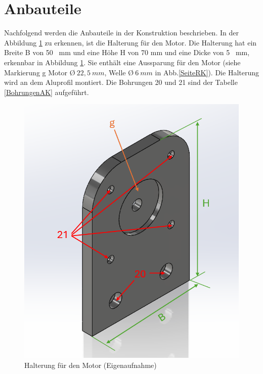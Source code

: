 \section{Anbauteile}

Nachfolgend werden die Anbauteile in der Konstruktion beschrieben. 
In der Abbildung \ref{FlankeMotorK} zu erkennen, ist die Halterung für den Motor. Die Halterung hat ein Breite B von 50 \ mm und eine Höhe H von 70 mm und eine Dicke von 5 \ mm, erkennbar in Abbildung \ref{FlankeMotorK}. Sie enthält eine Aussparung für den Motor (siehe Markierung g Motor \O $ \ 22,5 \ mm$, Welle \O $ \ 6 \ mm$  in Abb.\ref{SeiteRK}). Die Halterung wird an dem Aluprofil montiert. Die Bohrungen 20 und 21 sind der Tabelle \ref{BohrungenAK} aufgeführt. 
 
	\begin{figure}[H]
		\begin{center}
			\includegraphics[width=\textwidth]{Images/Konstruktion/FlankeMotorK.png}
			\caption{Halterung für den Motor (Eigenaufnahme)} \label{FlankeMotorK}
		\end{center}
	\end{figure}
 
